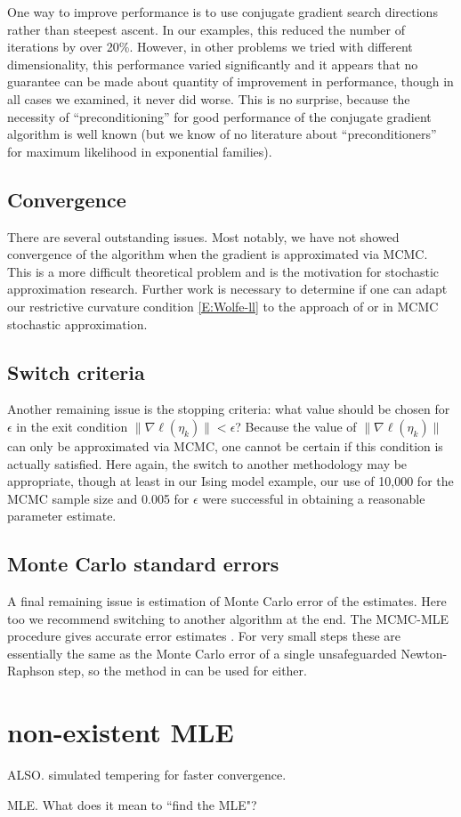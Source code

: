 One way to improve performance is to use conjugate gradient search directions rather 
than steepest ascent.  In our 
examples, this reduced the number of iterations by over 20\%.  However, in other 
problems we tried with different 
dimensionality, this performance varied significantly and it appears that no guarantee 
can be made about quantity of 
improvement in performance, though in all cases we examined, it never did worse.  This 
is no surprise, because the
necessity of ``preconditioning'' for good performance of the conjugate gradient 
algorithm is well known (but 
we know of no literature about ``preconditioners'' for 
maximum likelihood in exponential families).

\subsection{Convergence}
There are several outstanding issues.  Most notably, we have not showed convergence of 
the algorithm when the gradient 
is approximated via MCMC.  This is a more difficult theoretical problem and is the 
motivation for stochastic 
approximation research.  
Further work is necessary to determine if one can adapt our restrictive curvature 
condition \eqref{E:Wolfe-ll} to the 
approach of \citet{Andrieu:2005} or \citet{Liang:2010} in MCMC stochastic 
approximation.  

\subsection{Switch criteria}
Another remaining issue is the stopping criteria: what value should be chosen for $
\epsilon$ in the exit condition
$\lVert  \nabla \ell( \eta_k ) \rVert < \epsilon$?  Because the value of $\lVert  
\nabla \ell( \eta_k ) \rVert$ can only 
be approximated via MCMC, one cannot be certain if this condition is actually 
satisfied.  Here again, the switch to 
another methodology may be appropriate, though at least in our Ising model example, 
our use of 10,000 for the MCMC 
sample size and 0.005 for $\epsilon$ were successful in obtaining a reasonable 
parameter estimate. 

\subsection{Monte Carlo standard errors}
 A final remaining issue is estimation of Monte Carlo error of the estimates.  Here 
too we recommend switching to another
algorithm at the end.  The MCMC-MLE procedure gives accurate error estimates 
\citep{Geyer:1994}.
For very small steps these are essentially the same as the Monte Carlo error of a 
single unsafeguarded Newton-Raphson step,
so the method in \citep{Geyer:1994} can be used for either.

\section{non-existent MLE}
ALSO.  simulated tempering for faster convergence.

MLE.  What does it mean to ``find the MLE"?
